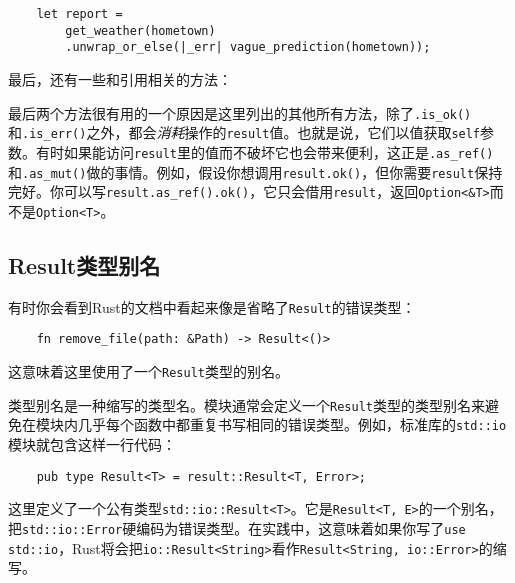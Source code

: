 \begin{verbatim}
    let report =
        get_weather(hometown)
        .unwrap_or_else(|_err| vague_prediction(hometown));
\end{verbatim}




最后，还有一些和引用相关的方法：


最后两个方法很有用的一个原因是这里列出的其他所有方法，除了\texttt{.is\_ok()}和\texttt{.is\_err()}之外，都会\emph{消耗}操作的\texttt{result}值。也就是说，它们以值获取\texttt{self}参数。有时如果能访问\texttt{result}里的值而不破坏它也会带来便利，这正是\texttt{.as\_ref()}和\texttt{.as\_mut()}做的事情。例如，假设你想调用\texttt{result.ok()}，但你需要\texttt{result}保持完好。你可以写\texttt{result.as\_ref().ok()}，它只会借用\texttt{result}，返回\texttt{Option<\&T>}而不是\texttt{Option<T>}。

\subsection{Result类型别名}
有时你会看到Rust的文档中看起来像是省略了\texttt{Result}的错误类型：
\begin{verbatim}
    fn remove_file(path: &Path) -> Result<()>
\end{verbatim}
这意味着这里使用了一个\texttt{Result}类型的别名。

类型别名是一种缩写的类型名。模块通常会定义一个\texttt{Result}类型的类型别名来避免在模块内几乎每个函数中都重复书写相同的错误类型。例如，标准库的\texttt{std::io}模块就包含这样一行代码：
\begin{verbatim}
    pub type Result<T> = result::Result<T, Error>;
\end{verbatim}

这里定义了一个公有类型\texttt{std::io::Result<T>}。它是\texttt{Result<T, E>}的一个别名，\\
把\texttt{std::io::Error}硬编码为错误类型。在实践中，这意味着如果你写了\texttt{use std::io}，Rust将会把\texttt{io::Result<String>}看作\texttt{Result<String, io::Error>}的缩写。


